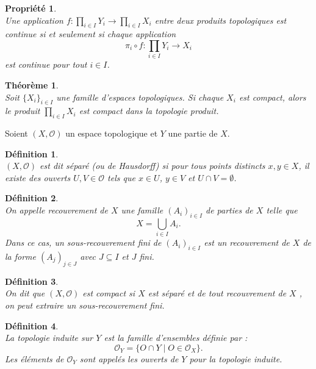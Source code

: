 \documentclass[a4paper, 14pt]{report}
\newtheorem{definition}{Définition}[section]
\newtheorem{propriety}{Propriété}[section]
\newtheorem{theorem}{Théorème}[section]
\begin{document}
\begin{onehalfspace}
{\begin{propriety}  \cite{bourbaki2013general}\\
Une application \( f:  \prod_{i \in I} Y_i \to \prod_{i \in I} X_i \) entre deux produits topologiques est continue si et seulement si chaque application  
\[
\pi_i \circ f: \prod_{i \in I} Y_i \to X_i
\]
est continue pour tout \( i \in I \).
\end{propriety}

\begin{theorem}	\cite{bourbaki2013general}\\
Soit \( \{ X_i \}_{i \in I} \) une famille d'espaces topologiques. Si chaque \( X_i \) est compact, alors le produit \( \prod_{i \in I} X_i \) est compact dans la topologie produit.	
\end{theorem}

Soient \( (X, \mathcal{O})\) un espace topologique et \( Y \) une partie de \( X \).

\begin{definition}\cite{bourbaki2013general}\\
\( (X, \mathcal{O}) \) est dit séparé (ou de Hausdorff) si pour tous points distincts \( x, y \in X \), il existe des ouverts \( U, V \in \mathcal{O} \) tels que \( x \in U \), \( y \in V \) et \( U \cap V = \emptyset \).
\end{definition}


\begin{definition} \cite{kuratowski2014topology}\\
On appelle recouvrement de \( X \) une famille \( (A_i)_{i \in I} \) de parties de \( X \) telle que 
		\[
		X = \bigcup_{i \in I} A_i.
		\]
Dans ce cas, un sous-recouvrement fini de \( (A_i)_{i \in I} \) est un recouvrement de \( X \) de la forme \( (A_j)_{j \in J} \) avec \( J \subseteq I \) et \(J\) fini.
\end{definition}

\begin{definition} \cite{kuratowski2014topology}\\
On dit que \( (X, \mathcal{O})\) est compact si \( X \) est séparé et de tout recouvrement de \( X \) , on peut extraire un sous-recouvrement fini.
\end{definition}


\begin{definition} \cite{kuratowski2014topology}\\
La topologie induite sur \( Y \) est la famille d’ensembles définie par :
	\[
	\mathcal{O}_Y = \{ O \cap Y \mid O \in \mathcal{O}_X \}.
	\]
Les éléments de \( \mathcal{O}_Y \) sont appelés les ouverts de \( Y \) pour la topologie induite.
\end{definition}

}
\end{onehalfspace}
\end{document}
